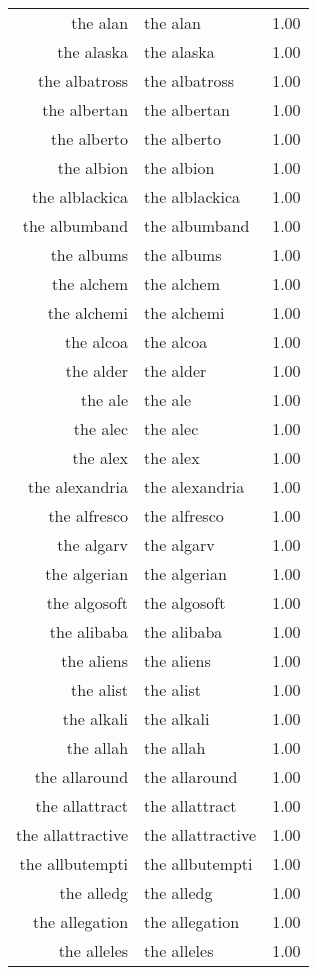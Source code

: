 \begin{table}[ht]
\begin{tabular}{rlr}
  the alan & the alan & 1.00 \\ 
  the alaska & the alaska & 1.00 \\ 
  the albatross & the albatross & 1.00 \\ 
  the albertan & the albertan & 1.00 \\ 
  the alberto & the alberto & 1.00 \\ 
  the albion & the albion & 1.00 \\ 
  the alblackica & the alblackica & 1.00 \\ 
  the albumband & the albumband & 1.00 \\ 
  the albums & the albums & 1.00 \\ 
  the alchem & the alchem & 1.00 \\ 
  the alchemi & the alchemi & 1.00 \\ 
  the alcoa & the alcoa & 1.00 \\ 
  the alder & the alder & 1.00 \\ 
  the ale & the ale & 1.00 \\ 
  the alec & the alec & 1.00 \\ 
  the alex & the alex & 1.00 \\ 
  the alexandria & the alexandria & 1.00 \\ 
  the alfresco & the alfresco & 1.00 \\ 
  the algarv & the algarv & 1.00 \\ 
  the algerian & the algerian & 1.00 \\ 
  the algosoft & the algosoft & 1.00 \\ 
  the alibaba & the alibaba & 1.00 \\ 
  the aliens & the aliens & 1.00 \\ 
  the alist & the alist & 1.00 \\ 
  the alkali & the alkali & 1.00 \\ 
  the allah & the allah & 1.00 \\ 
  the allaround & the allaround & 1.00 \\ 
  the allattract & the allattract & 1.00 \\ 
  the allattractive & the allattractive & 1.00 \\ 
  the allbutempti & the allbutempti & 1.00 \\ 
  the alledg & the alledg & 1.00 \\ 
  the allegation & the allegation & 1.00 \\ 
  the alleles & the alleles & 1.00 \\ 

\end{tabular}
\end{table}
